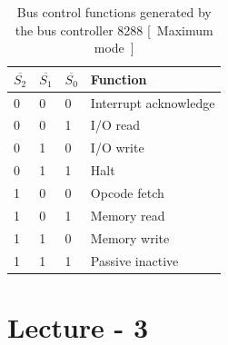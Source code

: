 \documentclass{article}
\begin{document}
\begin{table}[h!]
\centering
\begin{tabular}{ |p{1cm}|p{1cm}|p{1cm}|p{3cm}|  }
\hline
$ \overline{S_2} $ & $ \overline{S_1} $ & $ \overline{S_0} $ & Function   \\
\hline
0 & 0 & 0 & Interrupt acknowledge \\
0 & 0 & 1 & I/O read \\
0 & 1 & 0 & I/O write \\
0 & 1 & 1 & Halt \\
1 & 0 & 0 & Opcode fetch \\
1 & 0 & 1 & Memory read \\
1 & 1 & 0 & Memory write \\
1 & 1 & 1 & Passive inactive \\
\hline
\end{tabular}

\caption{Bus control functions generated by the bus controller 8288 [~Maximum mode~]}
\label{table:2}
\end{table}

\section{Lecture - 3 }
\end{document}
